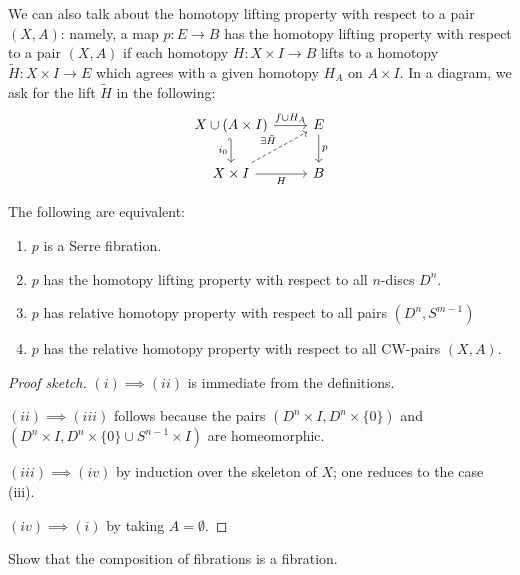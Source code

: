 \documentclass[ma3408.tex]{subfiles}
\begin{document}
\begin{Rem}
	We can also talk about the homotopy lifting property with respect to a pair $(X,A)$: namely, a map $p \colon E \to B$ has the homotopy lifting property with respect to a pair $(X,A)$ if each homotopy $H \colon X \times I \to B$ lifts to a homotopy $\tilde H \colon X \times I \to E$ which agrees with a given homotopy $H_A$ on $A \times I$. In a diagram, we ask for the lift $\tilde H$ in the following:
\[\begin{tikzcd}
	{X \cup (A \times I)} & E \\
	{X \times I} & B
	\arrow["p", from=1-2, to=2-2]
	\arrow["{f \cup H_A}", from=1-1, to=1-2]
	\arrow["H"', from=2-1, to=2-2]
	\arrow["{i_0}"', hook', from=1-1, to=2-1]
	\arrow["{\exists \tilde H}", dashed, from=2-1, to=1-2]
\end{tikzcd}\]
\end{Rem}
\begin{Thm}
	The following are equivalent:
	\begin{enumerate}[label=(\roman*)]
		\item $p$ is a Serre fibration. 
		\item $p$ has the homotopy lifting property with respect to all $n$-discs $D^n$. 
		\item $p$ has relative homotopy property with respect to all pairs $(D^n,S^{m-1})$
		\item $p$ has the relative homotopy property with respect to all CW-pairs $(X,A)$. 
	\end{enumerate}
\end{Thm}
\begin{proof}[Proof sketch]
	$(i) \implies (ii)$ is immediate from the definitions. 

	$(ii) \implies (iii)$ follows because the pairs $(D^n \times I,D^n \times \{ 0 \})$ and $(D^n \times I,D^n \times \{ 0 \} \cup S^{n-1} \times I)$ are homeomorphic. 

	$(iii) \implies (iv)$ by induction over the skeleton of $X$; one reduces to the case (iii). 

	$(iv) \implies (i)$ by taking $A = \emptyset$. \qedhere



\end{proof}
\begin{exercise}{}{}
Show that the composition of fibrations is a fibration. 
\end{exercise}
\end{document}
